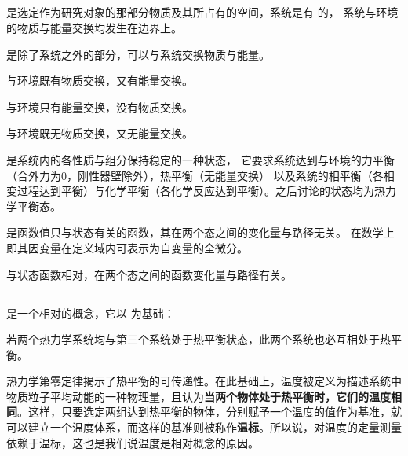 \subsection[基本概念]{}
\begin{Itemize}
    \item {} 是选定作为研究对象的那部分物质及其所占有的空间，系统是有 \linebreak 的，
    系统与环境的物质与能量交换均发生在边界上。
    \item {} 是除了系统之外的部分，可以与系统交换物质与能量。
    \item {} 与环境既有物质交换，又有能量交换。
    \item {} 与环境只有能量交换，没有物质交换。
    \item {} 与环境既无物质交换，又无能量交换。
    \item {} 是系统内的各性质与组分保持稳定的一种状态，
    它要求系统达到与环境的力平衡（合外力为0，刚性器壁除外），热平衡（无能量交换）
    以及系统的相平衡（各相变过程达到平衡）与化学平衡（各化学反应达到平衡）。之后讨论的状态均为热力学平衡态。
    \item {} 是函数值只与状态有关的函数，其在两个态之间的变化量与路径无关。
    在数学上即其因变量在定义域内可表示为自变量的全微分。
    \item {} 与状态函数相对，在两个态之间的函数变化量与路径有关。
\end{Itemize}
\subsection[温度]{}
 是一个相对的概念，它以 为基础：
\begin{law}
    若两个热力学系统均与第三个系统处于热平衡状态，此两个系统也必互相处于热平衡。
\end{law}

热力学第零定律揭示了热平衡的可传递性。在此基础上，温度被定义为描述系统中物质粒子平均动能的一种物理量，且认为\textbf{当两个物体处于热平衡时，它们的温度相同}。这样，只要选定两组达到热平衡的物体，分别赋予一个温度的值作为基准，就可以建立一个温度体系，而这样的基准则被称作\textbf{温标}。所以说，对温度的定量测量依赖于温标，这也是我们说温度是相对概念的原因。

